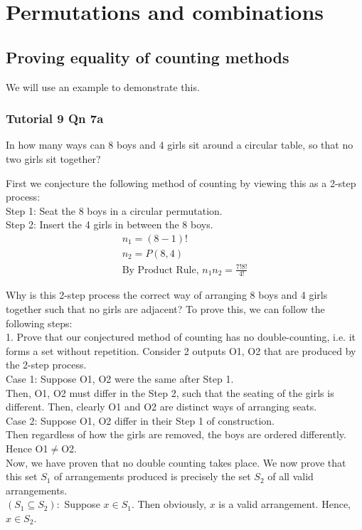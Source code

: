 \documentclass{article}
\begin{document}
\section{Permutations and combinations}
\subsection{Proving equality of counting methods}
We will use an example to demonstrate this.
\subsubsection{Tutorial 9 Qn 7a}
In how many ways can 8 boys and 4 girls sit around a circular table, so that no two girls sit together?

First we conjecture the following method of counting by viewing this as a 2-step process:\\
Step 1: Seat the 8 boys in a circular permutation.\\
Step 2: Insert the 4 girls in between the 8 boys.
\begin{align*}
    n_1=(8-1)!\\
    n_2=P(8,4)\\
    \text{By Product Rule, } n_1n_2=\frac{7!8!}{4!}
\end{align*}

Why is this 2-step process the correct way of arranging 8 boys and 4 girls together such that no girls are adjacent?
To prove this, we can follow the following steps:\\
1. Prove that our conjectured method of counting has no double-counting, i.e. it forms a set without repetition.
Consider 2 outputs O1, O2 that are produced by the 2-step process.\\
Case 1: Suppose O1, O2 were the same after Step 1.\\
Then, O1, O2 must differ in the Step 2, such that the seating of the girls is different. Then, clearly O1 and O2 are distinct ways of arranging seats.\\
Case 2: Suppose O1, O2 differ in their Step 1 of construction.\\
Then regardless of how the girls are removed, the boys are ordered differently. Hence O1$\neq$O2.\\
Now, we have proven that no double counting takes place. We now prove that this set $S_1$ of arrangements produced is precisely the set $S_2$ of all valid arrangements.\\
$(S_1\subseteq S_2):$
Suppose $x\in S_1$. Then obviously, $x$ is a valid arrangement. Hence, $x\in S_2$.
\end{document}
